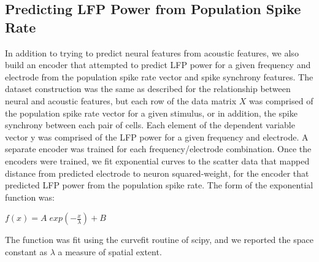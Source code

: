 \subsection{Predicting LFP Power from Population Spike Rate}

In addition to trying to predict neural features from acoustic features, we also build an encoder that attempted to predict LFP power for a given frequency and electrode from the population spike rate vector and spike synchrony features. The dataset construction was the same as described for the relationship between neural and acoustic features, but each row of the data matrix $X$ was comprised of the population spike rate vector for a given stimulus, or in addition, the spike synchrony between each pair of cells. Each element of the dependent variable vector y was comprised of the LFP power for a given frequency and electrode. A separate encoder was trained for each frequency/electrode combination. Once the encoders were trained, we fit exponential curves to the scatter data that mapped distance from predicted electrode to neuron squared-weight, for the encoder that predicted LFP power from the population spike rate. The form of the exponential function was:

\begin{center}
$f(x) = A \; exp(-\frac{x}{\lambda}) + B$
\end{center}

The function was fit using the curvefit routine of scipy, and we reported the space constant as $\lambda$ a measure of spatial extent.

